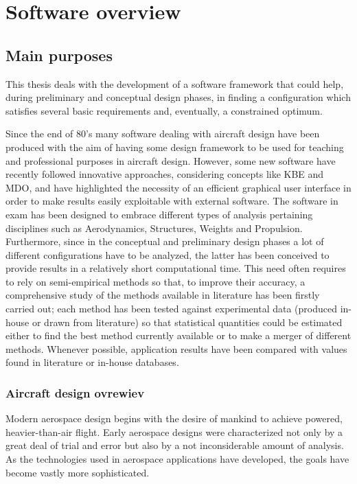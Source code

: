 \chapter{Software overview}
\section{Main purposes}
This thesis deals with the development of a software framework that could help, during preliminary and conceptual design phases, in finding a configuration which satisfies several basic requirements and, eventually, a constrained optimum. 

\bigskip
\noindent
Since the end of 80’s many software dealing with aircraft design have been produced with the aim of having some design framework to be used for teaching and professional purposes in aircraft design. However, some new software have recently followed innovative approaches, considering concepts like \gls{KBE} and \gls{MDO}, and have highlighted the necessity of an efficient graphical user interface in order to make results easily exploitable with external software.
%
The software in exam has been designed to embrace different types of analysis pertaining disciplines such as Aerodynamics, Structures, Weights and Propulsion. Furthermore, since in the conceptual and preliminary design phases a lot of different configurations have to be analyzed, the latter has been conceived to provide results in a relatively short computational time. This need often requires to rely on semi-empirical methods so that, to improve their accuracy, a comprehensive study of the methods available in literature has been firstly carried out; each method has been tested against experimental data (produced in-house or
drawn from literature) so that statistical quantities could be estimated either to find the best method currently available or to make a merger of different methods.
Whenever possible, application results have been compared with values found in literature or in-house databases.\cite{attanasio}

\subsection{Aircraft design ovrewiev}
Modern aerospace design begins with the desire of mankind to achieve powered, heavier-than-air flight. Early aerospace designs were characterized not only by a great deal of trial and error but also by a not inconsiderable amount of analysis. As the technologies used in aerospace applications
have developed, the goals have become vastly more sophisticated.

